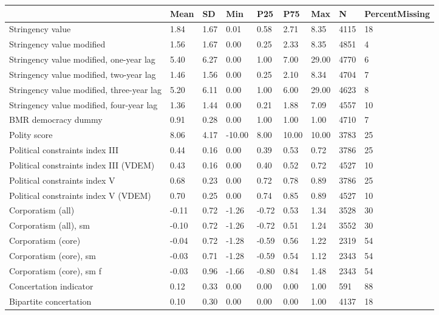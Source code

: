 
\begin{longtable}{lllllllll}
\toprule
  & Mean & SD & Min & P25 & P75 & Max & N & PercentMissing\\
\midrule
Stringency value & 1.84 & 1.67 & 0.01 & 0.58 & 2.71 & 8.35 & 4115 & 18\\
Stringency value modified & 1.56 & 1.67 & 0.00 & 0.25 & 2.33 & 8.35 & 4851 & 4\\
Stringency value modified, one-year lag & 5.40 & 6.27 & 0.00 & 1.00 & 7.00 & 29.00 & 4770 & 6\\
Stringency value modified, two-year lag & 1.46 & 1.56 & 0.00 & 0.25 & 2.10 & 8.34 & 4704 & 7\\
Stringency value modified, three-year lag & 5.20 & 6.11 & 0.00 & 1.00 & 6.00 & 29.00 & 4623 & 8\\
\addlinespace
Stringency value modified, four-year lag & 1.36 & 1.44 & 0.00 & 0.21 & 1.88 & 7.09 & 4557 & 10\\
BMR democracy dummy & 0.91 & 0.28 & 0.00 & 1.00 & 1.00 & 1.00 & 4710 & 7\\
Polity score & 8.06 & 4.17 & -10.00 & 8.00 & 10.00 & 10.00 & 3783 & 25\\
Political constraints index III & 0.44 & 0.16 & 0.00 & 0.39 & 0.53 & 0.72 & 3786 & 25\\
Political constraints index III (VDEM) & 0.43 & 0.16 & 0.00 & 0.40 & 0.52 & 0.72 & 4527 & 10\\
\addlinespace
Political constraints index V & 0.68 & 0.23 & 0.00 & 0.72 & 0.78 & 0.89 & 3786 & 25\\
Political constraints index V (VDEM) & 0.70 & 0.25 & 0.00 & 0.74 & 0.85 & 0.89 & 4527 & 10\\
Corporatism (all) & -0.11 & 0.72 & -1.26 & -0.72 & 0.53 & 1.34 & 3528 & 30\\
Corporatism (all), sm & -0.10 & 0.72 & -1.26 & -0.72 & 0.51 & 1.24 & 3552 & 30\\
Corporatism (core) & -0.04 & 0.72 & -1.28 & -0.59 & 0.56 & 1.22 & 2319 & 54\\
\addlinespace
Corporatism (core), sm & -0.03 & 0.71 & -1.28 & -0.59 & 0.54 & 1.12 & 2343 & 54\\
Corporatism (core), sm f & -0.03 & 0.96 & -1.66 & -0.80 & 0.84 & 1.48 & 2343 & 54\\
Concertation indicator & 0.12 & 0.33 & 0.00 & 0.00 & 0.00 & 1.00 & 591 & 88\\
Bipartite concertation & 0.10 & 0.30 & 0.00 & 0.00 & 0.00 & 1.00 & 4137 & 18\\

\end{longtable}
